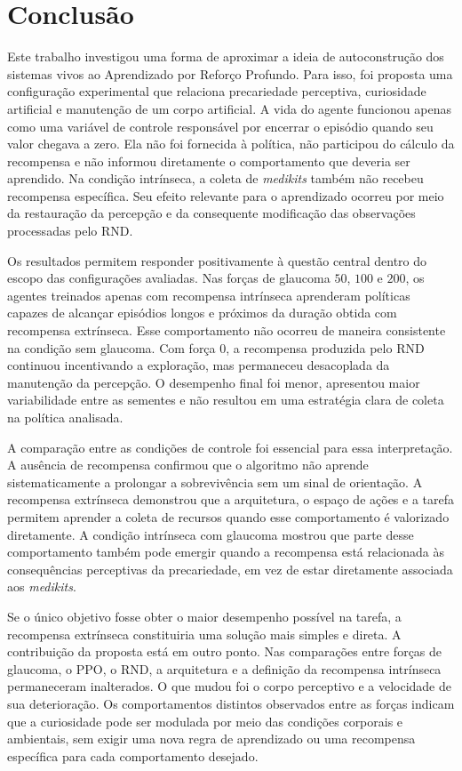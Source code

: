 \chapter{Conclusão}
\label{chap:conclusoes-e-trabalhos-futuros}

Este trabalho investigou uma forma de aproximar a ideia de autoconstrução dos sistemas vivos ao Aprendizado por Reforço Profundo. Para isso, foi proposta uma configuração experimental que relaciona precariedade perceptiva, curiosidade artificial e manutenção de um corpo artificial. A vida do agente funcionou apenas como uma variável de controle responsável por encerrar o episódio quando seu valor chegava a zero. Ela não foi fornecida à política, não participou do cálculo da recompensa e não informou diretamente o comportamento que deveria ser aprendido. Na condição intrínseca, a coleta de \textit{medikits} também não recebeu recompensa específica. Seu efeito relevante para o aprendizado ocorreu por meio da restauração da percepção e da consequente modificação das observações processadas pelo RND.

Os resultados permitem responder positivamente à questão central dentro do escopo das configurações avaliadas. Nas forças de glaucoma $50$, $100$ e $200$, os agentes treinados apenas com recompensa intrínseca aprenderam políticas capazes de alcançar episódios longos e próximos da duração obtida com recompensa extrínseca. Esse comportamento não ocorreu de maneira consistente na condição sem glaucoma. Com força $0$, a recompensa produzida pelo RND continuou incentivando a exploração, mas permaneceu desacoplada da manutenção da percepção. O desempenho final foi menor, apresentou maior variabilidade entre as sementes e não resultou em uma estratégia clara de coleta na política analisada.

A comparação entre as condições de controle foi essencial para essa interpretação. A ausência de recompensa confirmou que o algoritmo não aprende sistematicamente a prolongar a sobrevivência sem um sinal de orientação. A recompensa extrínseca demonstrou que a arquitetura, o espaço de ações e a tarefa permitem aprender a coleta de recursos quando esse comportamento é valorizado diretamente. A condição intrínseca com glaucoma mostrou que parte desse comportamento também pode emergir quando a recompensa está relacionada às consequências perceptivas da precariedade, em vez de estar diretamente associada aos \textit{medikits}.

Se o único objetivo fosse obter o maior desempenho possível na tarefa, a recompensa extrínseca constituiria uma solução mais simples e direta. A contribuição da proposta está em outro ponto. Nas comparações entre forças de glaucoma, o PPO, o RND, a arquitetura e a definição da recompensa intrínseca permaneceram inalterados. O que mudou foi o corpo perceptivo e a velocidade de sua deterioração. Os comportamentos distintos observados entre as forças indicam que a curiosidade pode ser modulada por meio das condições corporais e ambientais, sem exigir uma nova regra de aprendizado ou uma recompensa específica para cada comportamento desejado.

